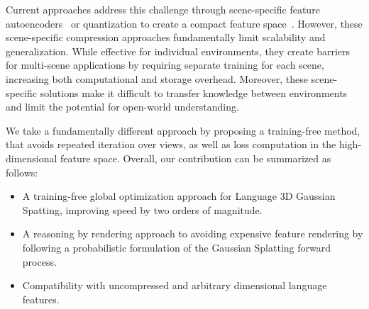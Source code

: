 Current approaches address this challenge through scene-specific feature autoencoders~\cite{qin2024langsplat} or quantization to create a compact feature space~\cite{shi2024language}. However, these scene-specific compression approaches fundamentally limit scalability and generalization. While effective for individual environments, they create barriers for multi-scene applications by requiring separate training for each scene, increasing both computational and storage overhead. Moreover, these scene-specific solutions make it difficult to transfer knowledge between environments and limit the potential for open-world understanding.

We take a fundamentally different approach by proposing a training-free method, that avoids repeated iteration over views, as well as loss computation in the high-dimensional feature space. Overall, our contribution can be summarized as follows:
\begin{itemize}
    \item A training-free global optimization approach for Language 3D Gaussian Spatting, improving speed by two orders of magnitude.
    \item A reasoning by rendering approach to avoiding expensive feature rendering by following a probabilistic formulation of the Gaussian Splatting forward process.
    \item Compatibility with uncompressed and arbitrary dimensional language features.
\end{itemize}

